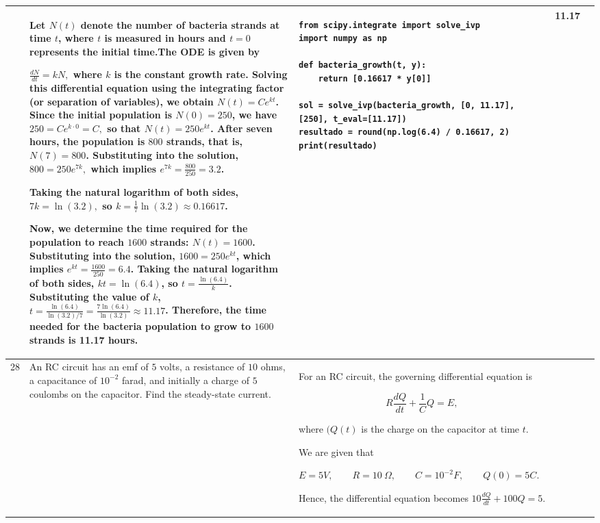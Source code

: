 \documentclass[a4paper,12pt]{article}
\begin{document}
\begin{longtable}{|p{0.3cm}|p{}|p{10cm}|p{}|p{1.5cm}|}
              & Let \(N(t)\) denote the number of bacteria strands at time \(t\), where \(t\) is measured in hours and \(t=0\) represents the initial time.The ODE is given by

$
\frac{dN}{dt}=kN,$ where $k$ is the constant growth rate. Solving this differential equation using the integrating factor (or separation of variables), we obtain $ N(t)=Ce^{kt}$. Since the initial population is $N(0)=250$, we have $250=Ce^{k\cdot 0}=C,$ so that $N(t)=250e^{kt}$.
After seven hours, the population is $800$ strands, that is,
$N(7)=800$.
Substituting into the solution, $
800=250e^{7k},$ which implies $ e^{7k}=\frac{800}{250}=3.2$.

Taking the natural logarithm of both sides, $7k=\ln(3.2),$
so $k=\frac{1}{7}\ln(3.2)\approx 0.16617$.

Now, we determine the time required for the population to reach $1600$ strands: $N(t)=1600$.
Substituting into the solution, $1600=250e^{kt}$, which implies
$e^{kt}=\frac{1600}{250}=6.4$.
Taking the natural logarithm of both sides, $kt=\ln(6.4)$, so
$t=\frac{\ln(6.4)}{k}$.
Substituting the value of $k$, $t=\frac{\ln(6.4)}{\ln(3.2)/7}
=\frac{7\ln(6.4)}{\ln(3.2)}
\approx 11.17$.
Therefore, the time needed for the bacteria population to grow to $1600$ strands is 11.17 hours.


 &\begin{verbatim}
from scipy.integrate import solve_ivp
import numpy as np

def bacteria_growth(t, y):
    return [0.16617 * y[0]]

sol = solve_ivp(bacteria_growth, [0, 11.17], [250], t_eval=[11.17])
resultado = round(np.log(6.4) / 0.16617, 2)
print(resultado)\end{verbatim} &11.17  \\ \hline 
  28           & An RC circuit has an emf of $5$ volts, a resistance of $10$ ohms, a capacitance of $10^{-2}$ farad, and initially a charge of $5$ coulombs on the capacitor. Find the steady-state current.


              & For an RC circuit, the governing differential equation is

\[
R\frac{dQ}{dt}+\frac{1}{C}Q=E,
\]

where $(Q(t)$ is the charge on the capacitor at time $t$.

We are given that

$
E=5V,\qquad
R=10\ \Omega,\qquad
C=10^{-2}F,\qquad
Q(0)= 5C.
$

Hence, the differential equation becomes $10\frac{dQ}{dt}+100Q=5$.


\end{longtable}
\end{document}
